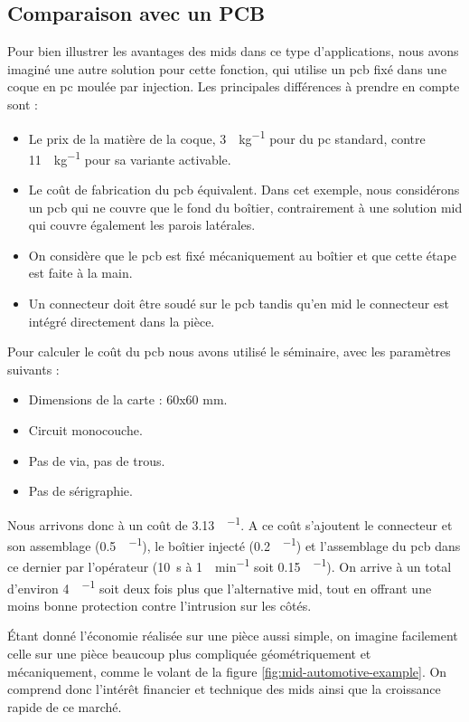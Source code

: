 \subsection{Comparaison avec un PCB}
Pour bien illustrer les avantages des \glspl{mid} dans ce type d'applications, nous avons imaginé une autre solution pour cette fonction, qui utilise un \gls{pcb} fixé dans une coque en \gls{pc} moulée par injection.
Les principales différences à prendre en compte sont :
\begin{itemize}
    \item Le prix de la matière de la coque, \SI{3}{\chf\per\kilogram} pour du \gls{pc} standard, contre \SI{11}{\chf\per\kilogram} pour sa variante activable.
    \item Le coût de fabrication du \gls{pcb} équivalent.
        Dans cet exemple, nous considérons un \gls{pcb} qui ne couvre que le fond du boîtier, contrairement à une solution \gls{mid} qui couvre également les parois latérales.
    \item On considère que le \gls{pcb} est fixé mécaniquement au boîtier et que cette étape est faite à la main.
    \item Un connecteur doit être soudé sur le \gls{pcb} tandis qu'en \gls{mid} le connecteur est intégré directement dans la pièce.
\end{itemize}

Pour calculer le coût du \gls{pcb} nous avons utilisé le séminaire\cite{pcb-2013}, avec les paramètres suivants :
\begin{itemize}
    \item Dimensions de la carte : 60x60 \si{\milli\meter}.
    \item Circuit monocouche.
    \item Pas de via, pas de trous.
    \item Pas de sérigraphie.
\end{itemize}

Nous arrivons donc à un coût de \SI{3.13}{\chf\per\piece}.
A ce coût s'ajoutent le connecteur et son assemblage (\SI{0.5}{\chf\per\piece}), le boîtier injecté (\SI{0.2}{\chf\per\piece}) et l'assemblage du \gls{pcb} dans ce dernier par l'opérateur
(\SI{10}{\second} à \SI{1}{\chf\per\minute} soit \SI{0.15}{\chf\per\piece}).
On arrive à un total d'environ \SI{4}{\chf\per\piece} soit deux fois plus que l'alternative \gls{mid}, tout en offrant une moins bonne protection contre l'intrusion sur les côtés.

Étant donné l'économie réalisée sur une pièce aussi simple, on imagine facilement celle sur une pièce beaucoup plus compliquée géométriquement et mécaniquement, comme le volant de la figure \ref{fig:mid-automotive-example}.
On comprend donc l'intérêt financier et technique des \glspl{mid} ainsi que la croissance rapide de ce marché.
